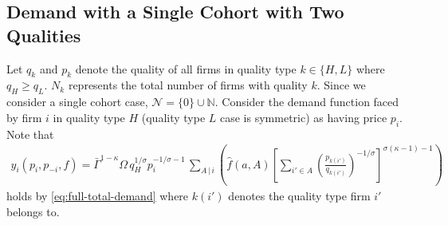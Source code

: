 \documentclass[12pt]{article}
\begin{document}
\subsection{Demand with a Single Cohort with Two Qualities}

Let $q_k$ and $p_k$ denote the quality of all firms in quality type $k \in \{H, L\}$ where $q_H \geq q_L$. $N_k$ represents the total number of firms with quality $k$. Since we consider a single cohort case, $\mathcal{N} = \{0\} \cup \mathbb{N}$. Consider the demand function faced by firm $i$ in quality type $H$ (quality type $L$ case is symmetric) as having price $p_i$. Note that 
\begin{align}
y_{i}(p_i, p_{-i}, f)  = \bar{\Gamma}^{1-\kappa}\Omega \, q_H^{1/\sigma}p_i^{-1/\sigma - 1}\,\sum_{{A}\,|\, i}\left(\hat{f}(a,A)\left[\sum_{i'\in A}\left( \frac{p_{k(i')}}{q_{k(i')}}\right)^{-1/\sigma}\right]^{\sigma (\kappa - 1)-1}\right)\label{eq:full-total-demand-two-quality}
\end{align}
holds by \cref{eq:full-total-demand} where $k(i')$ denotes the quality type firm $i'$ belongs to. 
\end{document}
